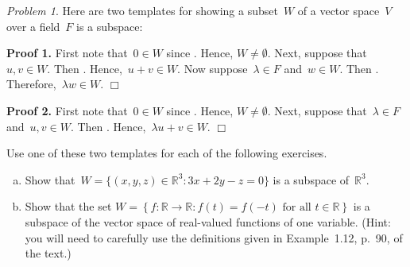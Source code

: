 \documentclass[11pt,twoside]{amsart}
\theoremstyle{plain}
\theoremstyle{remark}
\newtheorem{prob}{Problem}
\theoremstyle{definition}
\theoremstyle{definition}
\newcommand{\RR}{\mathbb{R}}
\begin{document}
\begin{prob}
Here are two templates for showing a subset~$W$ of a vector space~$V$ over a field~$F$ is a subspace:
\medskip

{\bf Proof 1.} First note that~$0\in W$ since \underline{\hspace{2cm}}. Hence, $W\neq\emptyset$. Next, suppose that~$u,v\in W$. Then \underline{\hspace{2cm}}. Hence,~$u+v\in W$.  Now suppose~$\lambda\in F$ and~$w\in W$.  Then \underline{\hspace{2cm}}.  Therefore,~$\lambda w\in W$.   \hfill$\Box$
\medskip

{\bf Proof 2.} First note that~$0\in W$ since \underline{\hspace{2cm}}. Hence, $W\neq\emptyset$. Next, suppose that~$\lambda\in F$ and~$u,v\in W$. Then \underline{\hspace{2cm}}. Hence,~$\lambda u+v\in W$. \hfill$\Box$

Use one of these two templates for each of the following exercises.
\begin{enumerate}[(a)]
\item Show that~$W=\{(x,y,z)\in\RR^3:3x+2y-z=0\}$ is a subspace of~$\RR^3$.
\item Show that the set $W=\left\{ f\colon\RR\to\RR: f(t)=f(-t) \text{ for all~$t\in \RR$} \right\}$ is a subspace of the vector space of real-valued functions of one variable. (Hint: you will need to carefully use the definitions given in Example~1.12, p.~90, of the text.)
\end{enumerate}
\end{prob}
\end{document}
